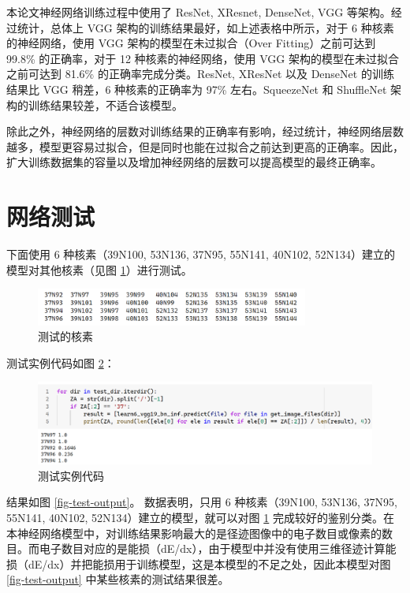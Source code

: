 \documentclass[AutoFakeBold]{LZUThesis}
\begin{document}
本论文神经网络训练过程中使用了 ResNet, XResnet, DenseNet, VGG 等架构。经过统计，总体上 VGG 架构的训练结果最好，如上述表格中所示，对于 6 种核素的神经网络，使用 VGG 架构的模型在未过拟合（Over Fitting）之前可达到 99.8\% 的正确率，对于 12 种核素的神经网络，使用 VGG 架构的模型在未过拟合之前可达到 81.6\% 的正确率完成分类。ResNet, XResNet 以及 DenseNet 的训练结果比 VGG 稍差，6 种核素的正确率为 97\% 左右。SqueezeNet 和 ShuffleNet 架构的训练结果较差，不适合该模型。

除此之外，神经网络的层数对训练结果的正确率有影响，经过统计，神经网络层数越多，模型更容易过拟合，但是同时也能在过拟合之前达到更高的正确率。因此，扩大训练数据集的容量以及增加神经网络的层数可以提高模型的最终正确率。



\section{网络测试}
下面使用 6 种核素（39N100, 53N136, 37N95, 55N141, 40N102, 52N134）建立的模型对其他核素（见图 \ref{fig-other-nuclides}）进行测试。


\begin{figure}[H]
    \centering
    \includegraphics[width=0.8\textwidth]{figures/other-nuclides.png}
    \caption{测试的核素}
    \label{fig-other-nuclides}
\end{figure}

测试实例代码如图 \ref{fig-test-code}：

\begin{figure}[H]
    \centering
    \includegraphics[width=1.0\textwidth]{figures/test-code.png}
    \caption{测试实例代码}
    \label{fig-test-code}
\end{figure}


结果如图 \ref{fig-test-output}。
数据表明，只用 6 种核素（39N100, 53N136, 37N95, 55N141, 40N102, 52N134）建立的模型，就可以对图 \ref{fig-other-nuclides} 完成较好的鉴别分类。在本神经网络模型中，对训练结果影响最大的是径迹图像中的电子数目或像素的数目。而电子数目对应的是能损（dE/dx），由于模型中并没有使用三维径迹计算能损（dE/dx）并把能损用于训练模型，这是本模型的不足之处，因此本模型对图 \ref{fig-test-output} 中某些核素的测试结果很差。
\end{document}
